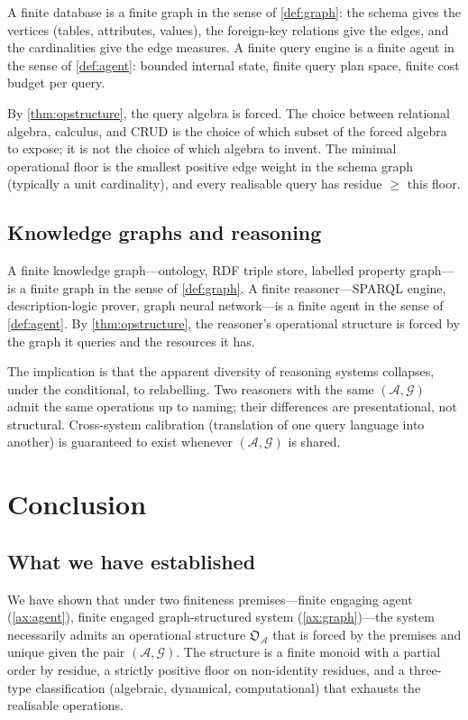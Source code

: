 \documentclass[11pt,a4paper]{article}
\theoremstyle{thmstyle}
\theoremstyle{definition}
\theoremstyle{remark}
\newcommand{\Graph}{\mathcal{G}}
\newcommand{\Agent}{\mathcal{A}}
\newcommand{\OpStr}{\mathfrak{O}}
\begin{document}
A finite database is a finite graph in the sense of
\cref{def:graph}: the schema gives the vertices (tables, attributes,
values), the foreign-key relations give the edges, and the
cardinalities give the edge measures. A finite query engine is a
finite agent in the sense of \cref{def:agent}: bounded internal
state, finite query plan space, finite cost budget per query.

By \cref{thm:opstructure}, the query algebra is forced. The choice
between relational algebra, calculus, and CRUD is the choice of
which subset of the forced algebra to expose; it is not the choice
of which algebra to invent. The minimal operational floor is the
smallest positive edge weight in the schema graph (typically a unit
cardinality), and every realisable query has residue $\geq$ this
floor.

\subsection{Knowledge graphs and reasoning}

A finite knowledge graph---ontology, RDF triple store, labelled
property graph---is a finite graph in the sense of \cref{def:graph}.
A finite reasoner---SPARQL engine, description-logic prover, graph
neural network---is a finite agent in the sense of \cref{def:agent}.
By \cref{thm:opstructure}, the reasoner's operational structure is
forced by the graph it queries and the resources it has.

The implication is that the apparent diversity of reasoning systems
collapses, under the conditional, to relabelling. Two reasoners
with the same $(\Agent, \Graph)$ admit the same operations up to
naming; their differences are presentational, not structural.
Cross-system calibration (translation of one query language into
another) is guaranteed to exist whenever $(\Agent, \Graph)$ is
shared.

\section{Conclusion}
\label{sec:conclusion}

\subsection{What we have established}

We have shown that under two finiteness premises---finite engaging
agent (\cref{ax:agent}), finite engaged graph-structured system
(\cref{ax:graph})---the system necessarily admits an operational
structure $\OpStr_\Agent$ that is forced by the premises and unique
given the pair $(\Agent, \Graph)$. The structure is a finite monoid
with a partial order by residue, a strictly positive floor on
non-identity residues, and a three-type classification (algebraic,
dynamical, computational) that exhausts the realisable operations.
\end{document}
